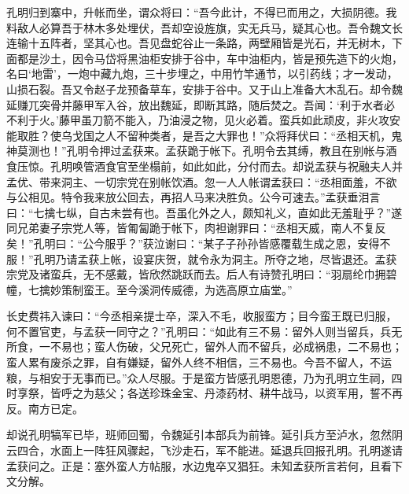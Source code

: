 孔明归到寨中，升帐而坐，谓众将曰：“吾今此计，不得已而用之，大损阴德。我料敌人必算吾于林木多处埋伏，吾却空设旌旗，实无兵马，疑其心也。吾令魏文长连输十五阵者，坚其心也。吾见盘蛇谷止一条路，两壁厢皆是光石，并无树木，下面都是沙土，因令马岱将黑油柜安排于谷中，车中油柜内，皆是预先造下的火炮，名曰‘地雷’，一炮中藏九炮，三十步埋之，中用竹竿通节，以引药线；才一发动，山损石裂。吾又令赵子龙预备草车，安排于谷中。又于山上准备大木乱石。却令魏延赚兀突骨并藤甲军入谷，放出魏延，即断其路，随后焚之。吾闻：‘利于水者必不利于火。’藤甲虽刀箭不能入，乃油浸之物，见火必着。蛮兵如此顽皮，非火攻安能取胜？使乌戈国之人不留种类者，是吾之大罪也！”众将拜伏曰：“丞相天机，鬼神莫测也！”孔明令押过孟获来。孟获跪于帐下。孔明令去其缚，教且在别帐与酒食压惊。孔明唤管酒食官至坐榻前，如此如此，分付而去。却说孟获与祝融夫人并孟优、带来洞主、一切宗党在别帐饮酒。忽一人人帐谓孟获曰：“丞相面羞，不欲与公相见。特令我来放公回去，再招人马来决胜负。公今可速去。”孟获垂泪言曰：“七擒七纵，自古未尝有也。吾虽化外之人，颇知礼义，直如此无羞耻乎？”遂同兄弟妻子宗党人等，皆匍匐跪于帐下，肉袒谢罪曰：“丞相天威，南人不复反矣！”孔明曰：“公今服乎？”获泣谢曰：“某子子孙孙皆感覆载生成之恩，安得不服！”孔明乃请孟获上帐，设宴庆贺，就令永为洞主。所夺之地，尽皆退还。孟获宗党及诸蛮兵，无不感戴，皆欣然跳跃而去。后人有诗赞孔明曰：“羽扇纶巾拥碧幢，七擒妙策制蛮王。至今溪洞传威德，为选高原立庙堂。”

长史费祎入谏曰：“今丞相亲提士卒，深入不毛，收服蛮方；目今蛮王既已归服，何不置官吏，与孟获一同守之？”孔明曰：“如此有三不易：留外人则当留兵，兵无所食，一不易也；蛮人伤破，父兄死亡，留外人而不留兵，必成祸患，二不易也；蛮人累有废杀之罪，自有嫌疑，留外人终不相信，三不易也。今吾不留人，不运粮，与相安于无事而已。”众人尽服。于是蛮方皆感孔明恩德，乃为孔明立生祠，四时享祭，皆呼之为慈父；各送珍珠金宝、丹漆药材、耕牛战马，以资军用，誓不再反。南方已定。

却说孔明犒军已毕，班师回蜀，令魏延引本部兵为前锋。延引兵方至泸水，忽然阴云四合，水面上一阵狂风骤起，飞沙走石，军不能进。延退兵回报孔明。孔明遂请孟获问之。正是：塞外蛮人方帖服，水边鬼卒又猖狂。未知孟获所言若何，且看下文分解。